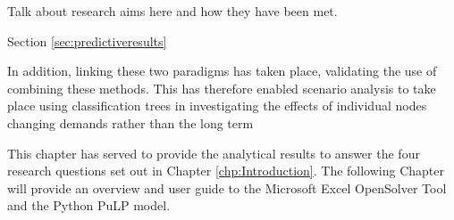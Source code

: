 \documentclass[../thesis.tex]{subfiles}
\begin{document}
Talk about research aims here and how they have been met.

Section \ref{sec:predictiveresults} 



In addition, linking these two paradigms has taken place, validating the use of combining these methods. This has therefore enabled scenario analysis to take place using classification trees in investigating the effects of individual nodes changing demands rather than the long term 

This chapter has served to provide the analytical results to answer the four research questions set out in Chapter \ref{chp:Introduction}. The following Chapter will provide an overview and user guide to the Microsoft Excel OpenSolver Tool and the Python PuLP model.
\end{document}
